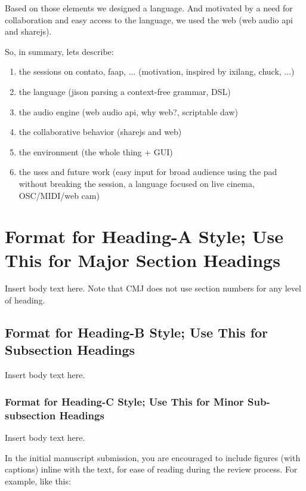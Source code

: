 \documentclass[letterpaper, 12pt]{article}
\begin{document}
Based on those elements we designed a language. And motivated by
a need for collaboration and easy access to the language, we used
the web (web audio api and sharejs).

So, in summary, lets describe:

\begin{enumerate}
  \item the sessions on contato, faap, ... (motivation, inspired by
    ixilang, chuck, ...)
  \item the language (jison parsing a context-free grammar, DSL)
  \item the audio engine (web audio api, why web?, scriptable daw)
  \item the collaborative behavior (sharejs and web)
  \item the environment (the whole thing + GUI)
  \item the uses and future work (easy input for broad audience using
    the pad without breaking the session, a language focused on live
    cinema, OSC/MIDI/web cam)
\end{enumerate}

\parskip 18pt

%
\section{Format for Heading-A Style; Use This for Major Section Headings}

Insert body text here.  Note that CMJ does not use section numbers for any level of heading.

\vspace*{24pt}

\subsection{Format for Heading-B Style; Use This for Subsection Headings}

Insert body text here.  

\subsubsection{Format for Heading-C Style; Use This for Minor Sub-subsection Headings}

Insert body text here.

In the initial manuscript submission, you are encouraged to include figures (with captions) inline with the text, for ease of reading during the review process. For example, like this:
\end{document}
